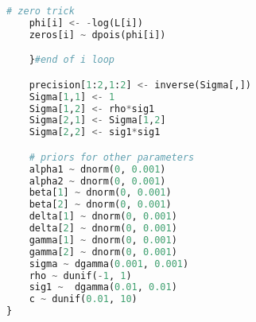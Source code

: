 \documentclass{article}
\begin{document}
\begin{appendices}
\begin{lstlisting}[language=python]
	# zero trick
	phi[i] <- -log(L[i])
	zeros[i] ~ dpois(phi[i])

	}#end of i loop

	precision[1:2,1:2] <- inverse(Sigma[,])
  	Sigma[1,1] <- 1
  	Sigma[1,2] <- rho*sig1
  	Sigma[2,1] <- Sigma[1,2]
  	Sigma[2,2] <- sig1*sig1

	# priors for other parameters
	alpha1 ~ dnorm(0, 0.001)
	alpha2 ~ dnorm(0, 0.001)
	beta[1] ~ dnorm(0, 0.001)
	beta[2] ~ dnorm(0, 0.001)
	delta[1] ~ dnorm(0, 0.001)
	delta[2] ~ dnorm(0, 0.001)
	gamma[1] ~ dnorm(0, 0.001)
	gamma[2] ~ dnorm(0, 0.001)
	sigma ~ dgamma(0.001, 0.001)
	rho ~ dunif(-1, 1)
	sig1 ~  dgamma(0.01, 0.01)
	c ~ dunif(0.01, 10)
}
\end{lstlisting}




\end{appendices}


%
%
% 
\end{document}
